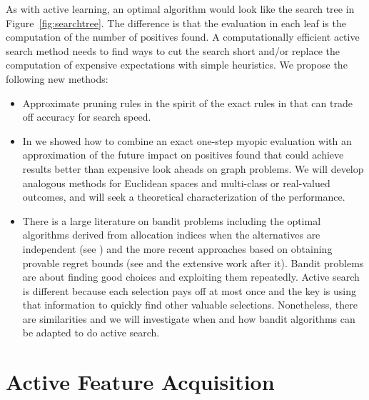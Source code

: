 \documentclass[prd,nofootbib,floatfix,11pt,tightenlines]{revtex4}
\begin{document}
As with active learning, an optimal algorithm would look like the search
tree in Figure~\ref{fig:searchtree}.  The difference is that the evaluation
in each leaf is the computation of the number of positives found.  A
computationally efficient active search method needs to find ways to cut
the search short and/or replace the computation of expensive expectations
with simple heuristics.  We propose the following new methods:
\vspace{.5\baselineskip}
\begin{itemize}
\item Approximate pruning rules in the spirit of the exact rules in
  \cite{Garnett12} that can trade off accuracy for search speed.

\item In \cite{Wang13} we showed how to combine an exact one-step myopic
  evaluation with an approximation of the future impact on positives found
  that could achieve results better than expensive look aheads on graph problems.
  We will develop analogous methods for Euclidean spaces and multi-class or
  real-valued outcomes, and will seek a theoretical characterization of the
  performance.

\item There is a large literature on bandit problems including the optimal
  algorithms derived from allocation indices when the alternatives are
  independent (see \cite{Gittin89}) and the more recent approaches based on
  obtaining provable regret bounds (see \cite{Auer02} and the extensive
  work after it).  Bandit problems are about finding good choices and
  exploiting them repeatedly.  Active search is different because each
  selection pays off at most once and the key is using that information to
  quickly find other valuable selections.  Nonetheless, there are
  similarities and we will investigate when and how bandit algorithms can
  be adapted to do active search.

\end{itemize}
\vspace{.5\baselineskip}

\section{Active Feature Acquisition}
\end{document}
